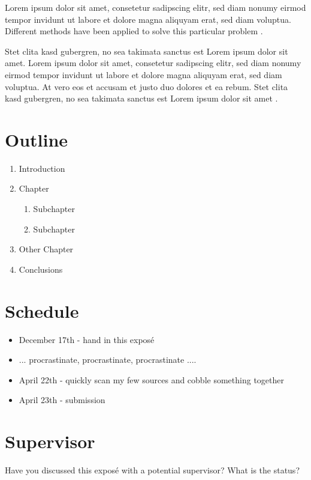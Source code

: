 \documentclass[12pt,a4paper]{article}
\begin{document}
Lorem ipsum dolor sit amet, consetetur sadipscing elitr, sed diam nonumy eirmod tempor invidunt ut labore et dolore magna aliquyam erat, sed diam voluptua. Different methods have been applied to solve this particular problem \autocite[]{McConnell:2004:CCS:1096143,Vandevoorde:2002}. 

Stet clita kasd gubergren, no sea takimata sanctus est Lorem ipsum dolor sit amet. Lorem ipsum dolor sit amet, consetetur sadipscing elitr, sed diam nonumy eirmod tempor invidunt ut labore et dolore magna aliquyam erat, sed diam voluptua. At vero eos et accusam et justo duo dolores et ea rebum. Stet clita kasd gubergren, no sea takimata sanctus est Lorem ipsum dolor sit amet .



\section*{Outline}

\begin{enumerate}
	\item Introduction
	\item Chapter
	\begin{enumerate}
		\item Subchapter
		\item Subchapter
	\end{enumerate}
	\item Other Chapter
	\item Conclusions
\end{enumerate}

\nocite{*}
\printbibliography

\section*{Schedule}

\begin{itemize}
	\item December 17th - hand in this exposé
	\item ... procrastinate, procrastinate, procrastinate ....
	\item April 22th - quickly scan my few sources and cobble something together
	\item April 23th - submission
\end{itemize}

\section*{Supervisor}

Have you discussed this exposé with a potential supervisor?
What is the status?
\end{document}
